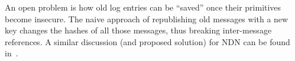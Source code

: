 \documentclass[9pt,sigconf,rewiew]{acmart}
\begin{document}
An open problem is how old log entries can be ``saved'' once their primitives become insecure. The naive approach of republishing old messages with a new key changes the hashes of all those messages, thus breaking inter-message references.
A similar discussion (and proposed solution) for NDN can be found in~\cite{DeLorean}.
%
%

%
%



\end{document}
